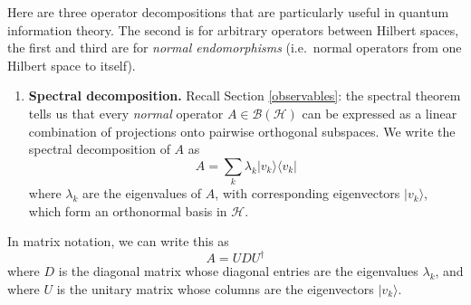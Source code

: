 \documentclass[fleqn,a4paper]{article}
\providecommand{\tightlist}{\setlength{\itemsep}{0pt}\setlength{\parskip}{0pt}}
\theoremstyle{definition}
\theoremstyle{definition}
\theoremstyle{definition}
\theoremstyle{definition}
\theoremstyle{remark}
\begin{document}
Here are three operator decompositions that are particularly useful in quantum information theory.
The second is for arbitrary operators between Hilbert spaces, the first and third are for \emph{normal endomorphisms} (i.e.~normal operators from one Hilbert space to itself).

\begin{enumerate}
\def\labelenumi{\arabic{enumi}.}
\tightlist
\item
  \textbf{Spectral decomposition.}
  Recall Section \ref{observables}: the spectral theorem tells us that every \emph{normal} operator \(A\in\mathcal{B}(\mathcal{H})\) can be expressed as a linear combination of projections onto pairwise orthogonal subspaces.
  We write the spectral decomposition of \(A\) as
  \[
   A = \sum_k \lambda_k |v_k\rangle\langle v_k|
    \]
  where \(\lambda_k\) are the eigenvalues of \(A\), with corresponding eigenvectors \(|v_k\rangle\), which form an orthonormal basis in \(\mathcal{H}\).
\end{enumerate}

In matrix notation, we can write this as
\[
    A = UDU^\dagger
  \]
where \(D\) is the diagonal matrix whose diagonal entries are the eigenvalues \(\lambda_k\), and where \(U\) is the unitary matrix whose columns are the eigenvectors \(|v_k\rangle\).
\end{document}
